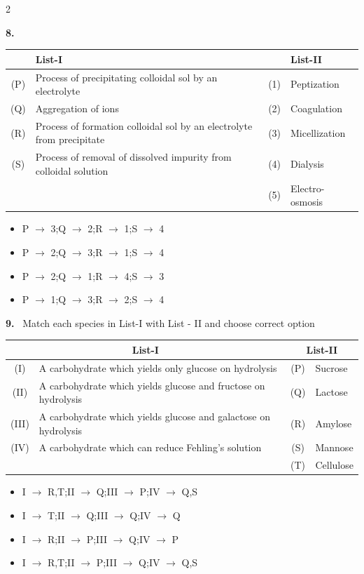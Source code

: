 \documentclass[10pt]{extarticle}
\newcommand{\qn}[1]{\par\smallskip\noindent\textbf{#1.}~}
\newenvironment{qoptions}{\begin{itemize}[leftmargin=1.8em,itemsep=1pt,topsep=2pt,label={}]}{\end{itemize}}
\newcommand{\opt}[2]{\item[(#1)] #2}
\begin{document}
\begin{multicols}{2}
\qn{8}\par\nopagebreak[4]
\begin{center}\small\setlength{\tabcolsep}{3pt}
\begin{tabular}{|c|p{2.7cm}|c|p{2.0cm}|}
\hline
 & \centering List-I & & \centering List-II \tabularnewline
\hline
(P) & Process of precipitating colloidal sol by an electrolyte & (1) & Peptization \\
\hline
(Q) & Aggregation of ions & (2) & Coagulation \\
\hline
(R) & Process of formation colloidal sol by an electrolyte from precipitate & (3) & Micellization \\
\hline
(S) & Process of removal of dissolved impurity from colloidal solution & (4) & Dialysis \\
\hline
 & & (5) & Electro-osmosis \\
\hline
\end{tabular}
\end{center}
\begin{qoptions}
\opt{A}{P $\to$ 3;Q $\to$ 2;R $\to$ 1;S $\to$ 4}
\opt{B}{P $\to$ 2;Q $\to$ 3;R $\to$ 1;S $\to$ 4}
\opt{C}{P $\to$ 2;Q $\to$ 1;R $\to$ 4;S $\to$ 3}
\opt{D}{P $\to$ 1;Q $\to$ 3;R $\to$ 2;S $\to$ 4}
\end{qoptions}

\qn{9} Match each species in List-I with List - II and choose correct option
\begin{center}\small\setlength{\tabcolsep}{3pt}
\begin{tabular}{|c|p{3.0cm}|c|p{1.4cm}|}
\hline
\multicolumn{2}{|c|}{List-I} & \multicolumn{2}{c|}{List-II} \\
\hline
(I) & A carbohydrate which yields only glucose on hydrolysis & (P) & Sucrose \\
\hline
(II) & A carbohydrate which yields glucose and fructose on hydrolysis & (Q) & Lactose \\
\hline
(III) & A carbohydrate which yields glucose and galactose on hydrolysis & (R) & Amylose \\
\hline
(IV) & A carbohydrate which can reduce Fehling's solution & (S) & Mannose \\
\hline
 & & (T) & Cellulose \\
\hline
\end{tabular}
\end{center}
\begin{qoptions}
\opt{A}{I $\to$ R,T;II $\to$ Q;III $\to$ P;IV $\to$ Q,S}
\opt{B}{I $\to$ T;II $\to$ Q;III $\to$ Q;IV $\to$ Q}
\opt{C}{I $\to$ R;II $\to$ P;III $\to$ Q;IV $\to$ P}
\opt{D}{I $\to$ R,T;II $\to$ P;III $\to$ Q;IV $\to$ Q,S}
\end{qoptions}


\end{multicols}
\end{document}
